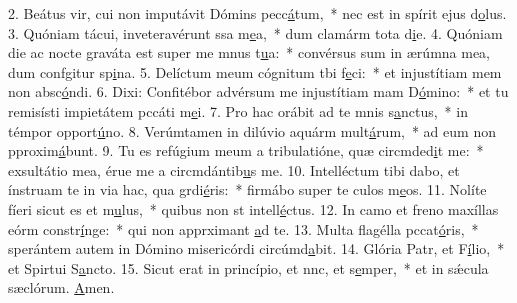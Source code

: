 2. Beátus vir, cui non imputávit Dómins pecc\uline{á}tum,~* nec est in spírit ejus d\uline{o}lus.
3. Quóniam tácui, inveteravérunt ssa m\uline{e}a,~* dum clamárm tota d\uline{i}e.
4. Quóniam die ac nocte graváta est super me mnus t\uline{u}a:~* convérsus sum in ærúmna mea, dum confgitur sp\uline{i}na.
5. Delíctum meum cógnitum tbi f\uline{e}ci:~* et injustítiam mem non absc\uline{ó}ndi.
6. Dixi: Confitébor advérsum me injustítiam mam D\uline{ó}mino:~* et tu remisísti impietátem pccáti m\uline{e}i.
7. Pro hac orábit ad te mnis s\uline{a}nctus,~* in témpor opport\uline{ú}no.
8. Verúmtamen in dilúvio aquárm mult\uline{á}rum,~* ad eum non pproxim\uline{á}bunt.
9. Tu es refúgium meum a tribulatióne, quæ circmded\uline{i}t me:~* exsultátio mea, érue me a circmdántib\uline{u}s me.
10. Intelléctum tibi dabo, et ínstruam te in via hac, qua grdi\uline{é}ris:~* firmábo super te culos m\uline{e}os.
11. Nolíte fíeri sicut es et m\uline{u}lus,~* quibus non st intell\uline{é}ctus.
12. In camo et freno maxíllas eórm constr\uline{í}nge:~* qui non apprximant \uline{a}d te.
13. Multa flagélla pccat\uline{ó}ris,~* sperántem autem in Dómino misericórdi circúmd\uline{a}bit.
14. Glória Patr, et F\uline{í}lio,~* et Spirtui S\uline{a}ncto.
15. Sicut erat in princípio, et nnc, et s\uline{e}mper,~* et in sǽcula sæclórum. \uline{A}men.
